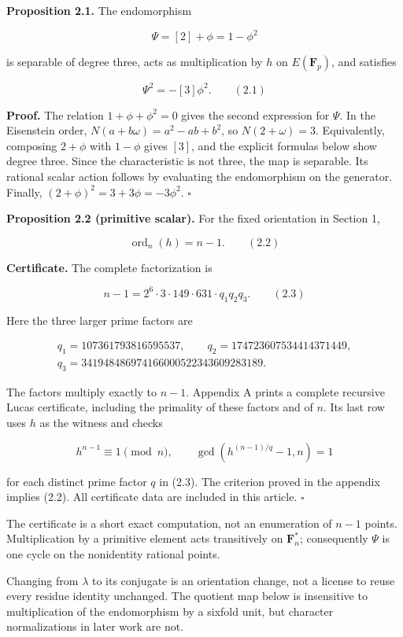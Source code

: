 \documentclass[
  11pt,
  a4paper,
]{article}
\begin{document}
\textbf{Proposition 2.1.} The endomorphism

\[
\Psi=[2]+\phi=1-\phi^2
\]

is separable of degree three, acts as multiplication by \(h\) on
\(E(\mathbf F_p)\), and satisfies

\[
\Psi^2=-[3]\phi^2. \qquad (2.1)
\]

\textbf{Proof.} The relation \(1+\phi+\phi^2=0\) gives the second
expression for \(\Psi\). In the Eisenstein order,
\(N(a+b\omega)=a^2-ab+b^2\), so \(N(2+\omega)=3\). Equivalently,
composing \(2+\phi\) with \(1-\phi\) gives \([3]\), and the explicit
formulas below show degree three. Since the characteristic is not three,
the map is separable. Its rational scalar action follows by evaluating
the endomorphism on the generator. Finally,
\((2+\phi)^2=3+3\phi=-3\phi^2\). \(\square\)

\textbf{Proposition 2.2 (primitive scalar).} For the fixed orientation
in Section 1,

\[
\operatorname{ord}_n(h)=n-1. \qquad (2.2)
\]

\textbf{Certificate.} The complete factorization is

\[
n-1=2^6\cdot3\cdot149\cdot631\cdot q_1q_2q_3. \qquad (2.3)
\]

Here the three larger prime factors are

\[
\begin{gathered}
q_1=107361793816595537,\qquad q_2=174723607534414371449,\\
q_3=341948486974166000522343609283189.
\end{gathered}
\]

The factors multiply exactly to \(n-1\). Appendix A prints a complete
recursive Lucas certificate, including the primality of these factors
and of \(n\). Its last row uses \(h\) as the witness and checks

\[
h^{n-1}\equiv1\pmod n,\qquad
\gcd(h^{(n-1)/q}-1,n)=1
\]

for each distinct prime factor \(q\) in (2.3). The criterion proved in
the appendix implies (2.2). All certificate data are included in this
article. \(\square\)

The certificate is a short exact computation, not an enumeration of
\(n-1\) points. Multiplication by a primitive element acts transitively
on \(\mathbf F_n^*\); consequently \(\Psi\) is one cycle on the
nonidentity rational points.

Changing from \(\lambda\) to its conjugate is an orientation change, not
a license to reuse every residue identity unchanged. The quotient map
below is insensitive to multiplication of the endomorphism by a sixfold
unit, but character normalizations in later work are not.
\end{document}
